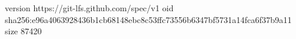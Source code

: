 version https://git-lfs.github.com/spec/v1
oid sha256:e96a4063928436b1cb68148ebc8c53ffc73556b6347bf5731a14fca6f37b9a11
size 87420
